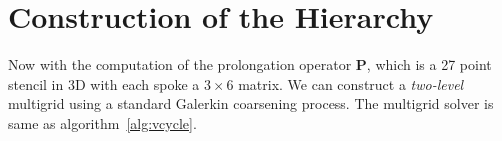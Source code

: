 \section{Construction of the Hierarchy}
Now with the computation of the prolongation operator $\mathbf{P}$, which is a 27 point stencil in 3D with each spoke a $3 \times 6$ matrix. We can construct a \textit{two-level} multigrid using a standard Galerkin coarsening process. The multigrid solver is same as algorithm~\ref{alg:vcycle}.
